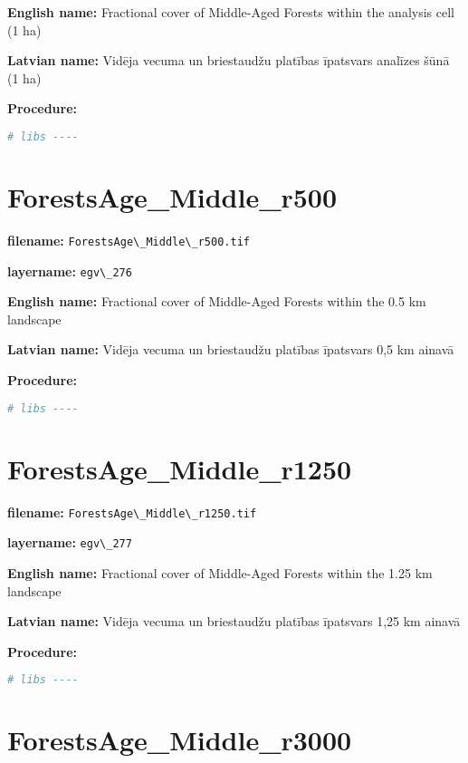 \documentclass[
]{book}
\newcommand{\passthrough}[1]{#1}
\begin{document}
\textbf{English name:} Fractional cover of Middle-Aged Forests within the analysis cell (1 ha)

\textbf{Latvian name:} Vidēja vecuma un briestaudžu platības īpatsvars analīzes šūnā (1 ha)

\textbf{Procedure:}

\begin{lstlisting}[language=R]
# libs ----
\end{lstlisting}

\section{ForestsAge\_Middle\_r500}\label{ch06.276}

\textbf{filename:} \passthrough{\lstinline!ForestsAge\_Middle\_r500.tif!}

\textbf{layername:} \passthrough{\lstinline!egv\_276!}

\textbf{English name:} Fractional cover of Middle-Aged Forests within the 0.5 km landscape

\textbf{Latvian name:} Vidēja vecuma un briestaudžu platības īpatsvars 0,5 km ainavā

\textbf{Procedure:}

\begin{lstlisting}[language=R]
# libs ----
\end{lstlisting}

\section{ForestsAge\_Middle\_r1250}\label{ch06.277}

\textbf{filename:} \passthrough{\lstinline!ForestsAge\_Middle\_r1250.tif!}

\textbf{layername:} \passthrough{\lstinline!egv\_277!}

\textbf{English name:} Fractional cover of Middle-Aged Forests within the 1.25 km landscape

\textbf{Latvian name:} Vidēja vecuma un briestaudžu platības īpatsvars 1,25 km ainavā

\textbf{Procedure:}

\begin{lstlisting}[language=R]
# libs ----
\end{lstlisting}

\section{ForestsAge\_Middle\_r3000}\label{ch06.278}
\end{document}
